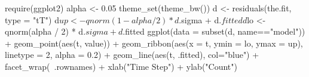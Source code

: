 \begin{Schunk}
\begin{Sinput}
 require(ggplot2)
 alpha <- 0.05
 theme_set(theme_bw())
 d <- residuals(the.fit, type = "tT")
 d$up <- qnorm(1 - alpha / 2) * d$.sigma + d$.fitted
 d$lo <- qnorm(alpha / 2) * d$.sigma + d$.fitted
 ggplot(data = subset(d, name=="model")) +
   geom_point(aes(t, value)) +
   geom_ribbon(aes(x = t, ymin = lo, ymax = up), linetype = 2, alpha = 0.2) +
   geom_line(aes(t, .fitted), col="blue") +
   facet_wrap(~.rownames) +
   xlab("Time Step") +
   ylab("Count")
\end{Sinput}
\end{Schunk}
